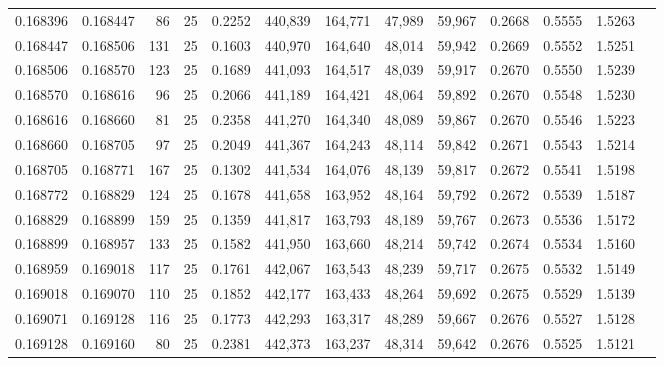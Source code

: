 \begin{tabular}{rrrrrrrrrrrrr}
0.168396 & 0.168447 &    86 &  25 &                                     0.2252 & 440,839 & 164,771 &  47,989 &  59,967 & 0.2668 & 0.5555 & 1.5263 \\
0.168447 & 0.168506 &   131 &  25 &                                     0.1603 & 440,970 & 164,640 &  48,014 &  59,942 & 0.2669 & 0.5552 & 1.5251 \\
0.168506 & 0.168570 &   123 &  25 &                                     0.1689 & 441,093 & 164,517 &  48,039 &  59,917 & 0.2670 & 0.5550 & 1.5239 \\
0.168570 & 0.168616 &    96 &  25 &                                     0.2066 & 441,189 & 164,421 &  48,064 &  59,892 & 0.2670 & 0.5548 & 1.5230 \\
0.168616 & 0.168660 &    81 &  25 &                                     0.2358 & 441,270 & 164,340 &  48,089 &  59,867 & 0.2670 & 0.5546 & 1.5223 \\
0.168660 & 0.168705 &    97 &  25 &                                     0.2049 & 441,367 & 164,243 &  48,114 &  59,842 & 0.2671 & 0.5543 & 1.5214 \\
0.168705 & 0.168771 &   167 &  25 &                                     0.1302 & 441,534 & 164,076 &  48,139 &  59,817 & 0.2672 & 0.5541 & 1.5198 \\
0.168772 & 0.168829 &   124 &  25 &                                     0.1678 & 441,658 & 163,952 &  48,164 &  59,792 & 0.2672 & 0.5539 & 1.5187 \\
0.168829 & 0.168899 &   159 &  25 &                                     0.1359 & 441,817 & 163,793 &  48,189 &  59,767 & 0.2673 & 0.5536 & 1.5172 \\
0.168899 & 0.168957 &   133 &  25 &                                     0.1582 & 441,950 & 163,660 &  48,214 &  59,742 & 0.2674 & 0.5534 & 1.5160 \\
0.168959 & 0.169018 &   117 &  25 &                                     0.1761 & 442,067 & 163,543 &  48,239 &  59,717 & 0.2675 & 0.5532 & 1.5149 \\
0.169018 & 0.169070 &   110 &  25 &                                     0.1852 & 442,177 & 163,433 &  48,264 &  59,692 & 0.2675 & 0.5529 & 1.5139 \\
0.169071 & 0.169128 &   116 &  25 &                                     0.1773 & 442,293 & 163,317 &  48,289 &  59,667 & 0.2676 & 0.5527 & 1.5128 \\
0.169128 & 0.169160 &    80 &  25 &                                     0.2381 & 442,373 & 163,237 &  48,314 &  59,642 & 0.2676 & 0.5525 & 1.5121 \\

\end{tabular}
